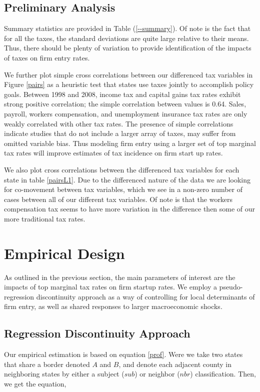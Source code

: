 \documentclass[12pt,a4paper]{article}
\begin{document}
\subsection{Preliminary Analysis}

Summary statistics are provided in Table (\ref{--summary}). Of note is the fact that for all the taxes, the standard deviations are quite large relative to their means. Thus, there should be plenty of variation to provide identification of the impacts of taxes on firm entry rates.

We further plot simple cross correlations between our differenced tax variables in Figure \ref{pairs} as a heuristic test that states use taxes jointly to accomplish policy goals. Between 1998 and 2008, income tax and capital gains tax rates exhibit strong positive correlation; the simple correlation between values is 0.64. Sales, payroll, workers compensation, and unemployment insurance tax rates are only weakly correlated with other tax rates. The presence of simple correlations indicate studies that do not include a larger array of taxes, may suffer from omitted variable bias. Thus modeling firm entry using a larger set of top marginal tax rates will improve estimates of tax incidence on firm start up rates.

We also plot cross correlations between the differenced tax variables for each state in table \ref{pairsL1}. Due to the differenced nature of the data we are looking for co-movement between tax variables, which we see in a non-zero number of cases between all of our different tax variables. Of note is that the workers compensation tax seems to have more variation in the difference then some of our more traditional tax rates.
\section{Empirical Design}

As outlined in the previous section, the main parameters of interest are the impacts of top marginal tax rates on firm startup rates. We employ a pseudo-regression discontinuity approach as a way of controlling for local determinants of firm entry, as well as shared responses to larger macroeconomic shocks.

\subsection{Regression Discontinuity Approach}

Our empirical estimation is based on equation \ref{prof}. Were we take two states that share a border denoted $A$ and $B$, and denote each adjacent county in neighboring states by either a subject ($sub$) or neighbor ($nbr$) classification. Then, we get the equation,
\end{document}
